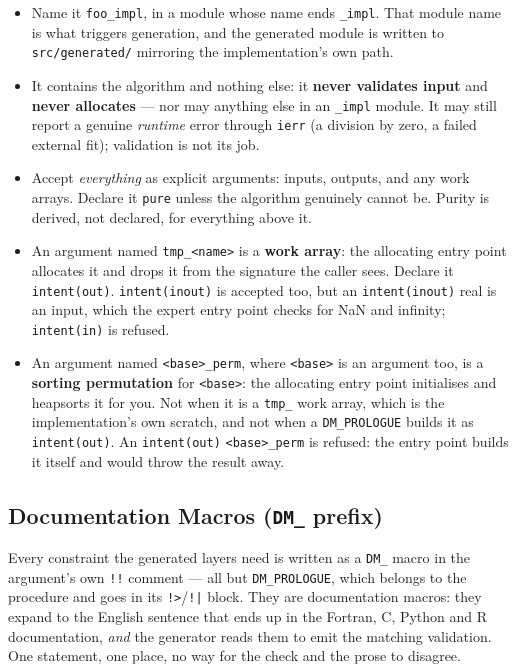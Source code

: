 \documentclass{article}
\begin{document}
\begin{itemize}
  \item Name it \texttt{foo\_impl}, in a module whose name ends \texttt{\_impl}. That module name
        is what triggers generation, and the generated module is written to
        \texttt{src/generated/} mirroring the implementation's own path.
  \item It contains the algorithm and nothing else: it \textbf{never validates input} and
        \textbf{never allocates} — nor may anything else in an \texttt{\_impl} module. It may
        still report a genuine \emph{runtime} error through \texttt{ierr} (a division by zero, a
        failed external fit); validation is not its job.
  \item Accept \emph{everything} as explicit arguments: inputs, outputs, and any work arrays.
        Declare it \texttt{pure} unless the algorithm genuinely cannot be. Purity is derived, not
        declared, for everything above it.
  \item An argument named \texttt{tmp\_<name>} is a \textbf{work array}: the allocating entry point
        allocates it and drops it from the signature the caller sees. Declare it
        \texttt{intent(out)}. \texttt{intent(inout)} is accepted too, but an \texttt{intent(inout)}
        real is an input, which the expert entry point checks for NaN and infinity;
        \texttt{intent(in)} is refused.
  \item An argument named \texttt{<base>\_perm}, where \texttt{<base>} is an argument too, is a
        \textbf{sorting permutation} for \texttt{<base>}: the allocating entry point initialises
        and heapsorts it for you. Not when it is a \texttt{tmp\_} work array, which is the
        implementation's own scratch, and not when a \texttt{DM\_PROLOGUE} builds it as
        \texttt{intent(out)}. An \texttt{intent(out)} \texttt{<base>\_perm} is refused: the
        entry point builds it itself and would throw the result away.
\end{itemize}

\subsection{Documentation Macros (\texttt{DM\_} prefix)}

Every constraint the generated layers need is written as a \texttt{DM\_} macro in the argument's own
\texttt{!!} comment --- all but \texttt{DM\_PROLOGUE}, which belongs to the procedure and goes in its
\texttt{!>}/\texttt{!|} block. They are documentation macros: they expand to the English sentence that ends up
in the Fortran, C, Python and R documentation, \emph{and} the generator reads them to emit the
matching validation. One statement, one place, no way for the check and the prose to disagree.
\end{document}
